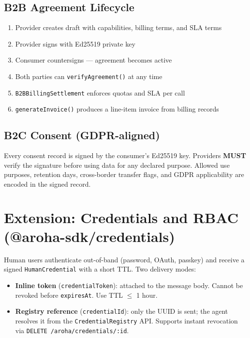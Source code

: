 \documentclass[11pt,a4paper]{article}
\begin{document}
\subsection{B2B Agreement Lifecycle}

\begin{enumerate}[noitemsep, label=\textbf{\arabic*.}]
  \item Provider creates draft with capabilities, billing terms, and SLA terms
  \item Provider signs with Ed25519 private key
  \item Consumer countersigns --- agreement becomes active
  \item Both parties can \texttt{verifyAgreement()} at any time
  \item \texttt{B2BBillingSettlement} enforces quotas and SLA per call
  \item \texttt{generateInvoice()} produces a line-item invoice from billing records
\end{enumerate}

\subsection{B2C Consent (GDPR-aligned)}

Every consent record is signed by the consumer's Ed25519 key. Providers
\textbf{MUST} verify the signature before using data for any declared purpose.
Allowed use purposes, retention days, cross-border transfer flags, and GDPR
applicability are encoded in the signed record.

\section{Extension: Credentials and RBAC (@aroha-sdk/credentials)}

Human users authenticate out-of-band (password, OAuth, passkey) and receive a
signed \texttt{HumanCredential} with a short TTL. Two delivery modes:

\begin{itemize}[noitemsep]
  \item \textbf{Inline token} (\texttt{credentialToken}): attached to the message
        body. Cannot be revoked before \texttt{expiresAt}. Use TTL $\leq$ 1 hour.
  \item \textbf{Registry reference} (\texttt{credentialId}): only the UUID is sent;
        the agent resolves it from the \texttt{CredentialRegistry} API. Supports
        instant revocation via \texttt{DELETE /aroha/credentials/:id}.
\end{itemize}
\end{document}
